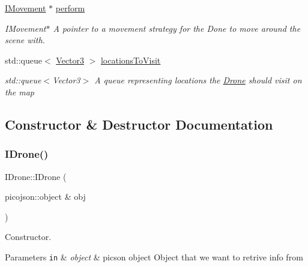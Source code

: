 \begin{DoxyCompactItemize}
\mbox{\label{classIDrone_a208565b0b4c7f5a485a7d9a0e9ca23d0}} 
\hyperlink{classIMovement}{I\+Movement} $\ast$ \hyperlink{classIDrone_a208565b0b4c7f5a485a7d9a0e9ca23d0}{perform}
\begin{DoxyCompactList}\small\item\em I\+Movement$\ast$ A pointer to a movement strategy for the Done to move around the scene with. \end{DoxyCompactList}\item 
\mbox{\label{classIDrone_a5c8bd9edded1b4b4ef9cde53ce66f2cc}} 
std\+::queue$<$ \hyperlink{classVector3}{Vector3} $>$ \hyperlink{classIDrone_a5c8bd9edded1b4b4ef9cde53ce66f2cc}{locations\+To\+Visit}
\begin{DoxyCompactList}\small\item\em std\+::queue$<$\+Vector3$>$ A queue representing locations the \hyperlink{classDrone}{Drone} should visit on the map \end{DoxyCompactList}\end{DoxyCompactItemize}


\subsection{Constructor \& Destructor Documentation}
\mbox{\label{classIDrone_a7376a746197d7d24f09b8ad94fcee465}} 
\subsubsection{\texorpdfstring{I\+Drone()}{IDrone()}}
{\footnotesize\ttfamily I\+Drone\+::\+I\+Drone (\begin{DoxyParamCaption}\item[{picojson\+::object \&}]{obj }\end{DoxyParamCaption})\hspace{0.3cm}{\ttfamily [inline]}}



Constructor. 


\begin{DoxyParams}[1]{Parameters}
\mbox{\tt in}  & {\em object} & picson object Object that we want to retrive info from \\
\hline
\end{DoxyParams}


